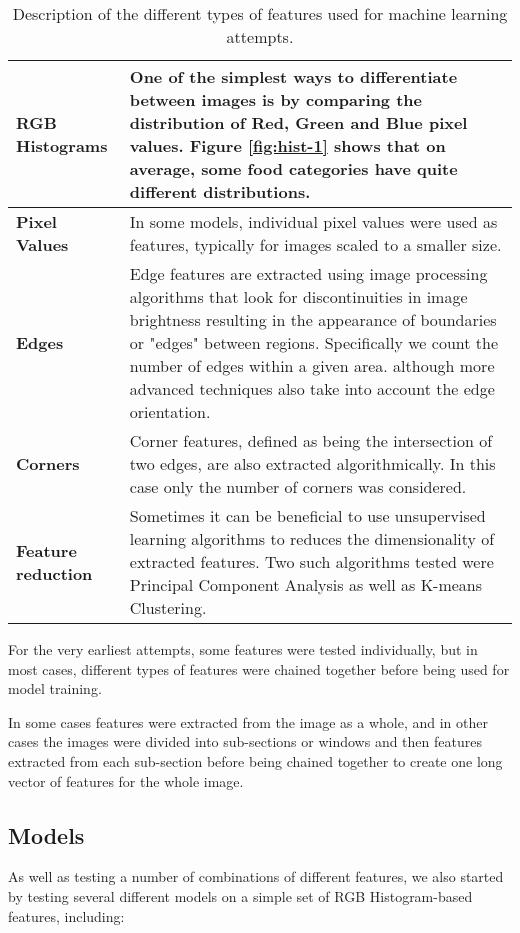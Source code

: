 \documentclass[10pt,a4paper]{article}
\begin{document}
\begin{table}[h]
\caption{Description of the different types of features used for machine learning attempts.}
\small
\setlength\extrarowheight{4pt}
\begin{tabular}{p{4cm} p{9cm}}
\hline
\textbf{RGB Histograms} & One of the simplest ways to differentiate between images is by comparing the distribution of Red, Green and Blue pixel values. Figure \ref{fig:hist-1} shows that on average, some food categories have quite different distributions. \\
\hline
\textbf{Pixel Values} & In some models, individual pixel values were used as features, typically for images scaled to a smaller size. \\
\hline
\textbf{Edges} & Edge features are extracted using image processing algorithms that look for discontinuities in image brightness resulting in the appearance of boundaries or "edges" between regions. Specifically we count the number of edges within a given area. although more advanced techniques also take into account the edge orientation.\\
\hline
\textbf{Corners} & Corner features, defined as being the intersection of two edges, are also extracted algorithmically. In this case only the number of corners was considered. \\
\hline
\textbf{Feature reduction} & Sometimes it can be beneficial to use unsupervised learning algorithms to reduces the dimensionality of extracted features. Two such algorithms tested were Principal Component Analysis as well as K-means Clustering. \\
\hline
\end{tabular}
\label{table:features}
\end{table}

For the very earliest attempts, some features were tested individually, but in most cases, different types of features were chained together before being used for model training.

In some cases features were extracted from the image as a whole, and in other cases the images were divided into sub-sections or windows and then features extracted from each sub-section before being chained together to create one long vector of features for the whole image.

\subsection*{Models}

As well as testing a number of combinations of different features, we also started by testing several different models on a simple set of RGB Histogram-based features, including:
\end{document}

